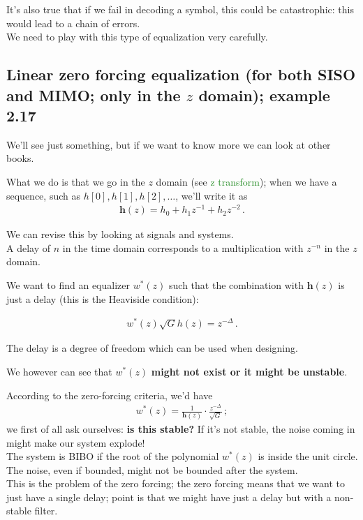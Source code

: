 \documentclass[a4paper, 12pt]{book}
\begin{document}
It's also true that if we fail in decoding a symbol, this could be catastrophic: this would lead to a chain of errors.\\
We need to play with this type of equalization very carefully.

\subsection[Linear zero forcing equalization]{Linear zero forcing equalization (for both SISO and MIMO; only in the $z$ domain); example 2.17}

We'll see just something, but if we want to know more we can look at other books.

What we do is that we go in the $z$ domain (see \textcolor{ForestGreen}{z transform}); when we have a sequence, such as $h[0], h[1], h[2], \dots$, we'll write it as
\begin{align}
    \mathbf{h}(z) = h_0 + h_1 z^{-1} + h_2 z^{-2} \,.
\end{align}

\begin{tcolorbox}[colback=obsidianGreen, colframe=white, boxrule=0pt, sharp corners]
    We can revise this by looking at signals and systems.\\
    A delay of $n$ in the time domain corresponds to a multiplication with $z^{-n}$ in the $z$ domain.
\end{tcolorbox}

We want to find an equalizer $w^*(z)$ such that the combination with $\mathbf{h}(z)$ is just a delay (this is the Heaviside condition):

\begin{align}
    w^*(z)\sqrt{G}h(z) = z^{-\Delta} \,. \tag{2.124}
\end{align}

The delay is a degree of freedom which can be used when designing.

We however can see that $w^*(z)$ \textbf{might not exist or it might be unstable}.

According to the zero-forcing criteria, we'd have
\begin{align}
    w^*(z) = \frac{1}{\mathbf{h}(z)} \cdot \frac{z^{-\Delta}}{\sqrt{G}} \,;
\end{align}
we first of all ask ourselves: \textbf{is this stable?} If it's not stable, the noise coming in might make our system explode!\\
The system is BIBO if the root of the polynomial $w^*(z)$ is inside the unit circle. The noise, even if bounded, might not be bounded after the system.\\
This is the problem of the zero forcing; the zero forcing means that we want to just have a single delay; point is that we might have just a delay but with a non-stable filter.
\end{document}
